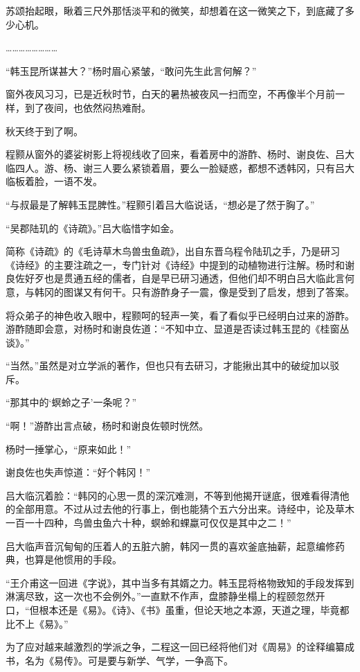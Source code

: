 苏颂抬起眼，瞅着三尺外那恬淡平和的微笑，却想着在这一微笑之下，到底藏了多少心机。 

…………………… 

“韩玉昆所谋甚大？”杨时眉心紧皱，“敢问先生此言何解？” 

窗外夜风习习，已是近秋时节，白天的暑热被夜风一扫而空，不再像半个月前一样，到了夜间，也依然闷热难耐。 

秋天终于到了啊。 

程颢从窗外的婆娑树影上将视线收了回来，看着房中的游酢、杨时、谢良佐、吕大临四人。游、杨、谢三人要么紧锁着眉，要么一脸疑惑，都想不透韩冈，只有吕大临板着脸，一语不发。 

“与叔最是了解韩玉昆脾性。”程颢引着吕大临说话，“想必是了然于胸了。” 

“吴郡陆玑的《诗疏》。”吕大临惜字如金。 

简称《诗疏》的《毛诗草木鸟兽虫鱼疏》，出自东晋乌程令陆玑之手，乃是研习《诗经》的主要注疏之一，专门针对《诗经》中提到的动植物进行注解。杨时和谢良佐好歹也是贯通五经的儒者，自是早已研习通透，但他们却不明白吕大临此言何意，与韩冈的图谋又有何干。只有游酢身子一震，像是受到了启发，想到了答案。 

将众弟子的神色收入眼中，程颢呵的轻声一笑，看了看似乎已经明白过来的游酢。游酢随即会意，对杨时和谢良佐道：“不知中立、显道是否读过韩玉昆的《桂窗丛谈》。” 

“当然。”虽然是对立学派的著作，但也只有去研习，才能揪出其中的破绽加以驳斥。 

“那其中的‘螟蛉之子’一条呢？” 

“啊！”游酢出言点破，杨时和谢良佐顿时恍然。 

杨时一捶掌心，“原来如此！” 

谢良佐也失声惊道：“好个韩冈！” 

吕大临沉着脸：“韩冈的心思一贯的深沉难测，不等到他揭开谜底，很难看得清他的全部用意。不过从过去他的行事上，倒也能猜个五六分出来。诗经中，论及草木一百一十四种，鸟兽虫鱼六十种，螟蛉和蜾蠃可仅仅是其中之二！” 

吕大临声音沉甸甸的压着人的五脏六腑，韩冈一贯的喜欢釜底抽薪，起意编修药典，也算是他惯用的手段。 

“王介甫这一回进《字说》，其中当多有其婿之力。韩玉昆将格物致知的手段发挥到淋漓尽致，这一次也不会例外。”一直默不作声，盘膝静坐榻上的程颐忽然开口，“但根本还是《易》。《诗》、《书》虽重，但论天地之本源，天道之理，毕竟都比不上《易》。” 

为了应对越来越激烈的学派之争，二程这一回已经将他们对《周易》的诠释编纂成书，名为《易传》。可是要与新学、气学，一争高下。 

